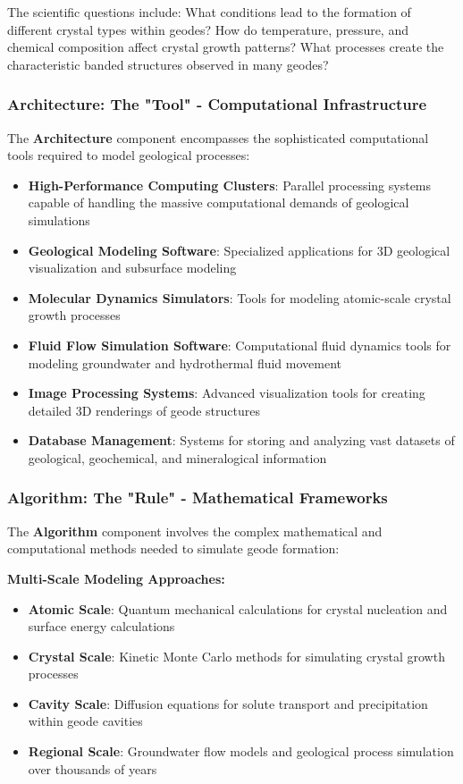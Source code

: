 The scientific questions include: What conditions lead to the formation of different crystal types within geodes? How do temperature, pressure, and chemical composition affect crystal growth patterns? What processes create the characteristic banded structures observed in many geodes?

\subsubsection{Architecture: The "Tool" - Computational Infrastructure}

The \textbf{Architecture} component encompasses the sophisticated computational tools required to model geological processes:

\begin{itemize}
    \item \textbf{High-Performance Computing Clusters}: Parallel processing systems capable of handling the massive computational demands of geological simulations
    \item \textbf{Geological Modeling Software}: Specialized applications for 3D geological visualization and subsurface modeling
    \item \textbf{Molecular Dynamics Simulators}: Tools for modeling atomic-scale crystal growth processes
    \item \textbf{Fluid Flow Simulation Software}: Computational fluid dynamics tools for modeling groundwater and hydrothermal fluid movement
    \item \textbf{Image Processing Systems}: Advanced visualization tools for creating detailed 3D renderings of geode structures
    \item \textbf{Database Management}: Systems for storing and analyzing vast datasets of geological, geochemical, and mineralogical information
\end{itemize}

\subsubsection{Algorithm: The "Rule" - Mathematical Frameworks}

The \textbf{Algorithm} component involves the complex mathematical and computational methods needed to simulate geode formation:

\textbf{Multi-Scale Modeling Approaches:}
\begin{itemize}
    \item \textbf{Atomic Scale}: Quantum mechanical calculations for crystal nucleation and surface energy calculations
    \item \textbf{Crystal Scale}: Kinetic Monte Carlo methods for simulating crystal growth processes
    \item \textbf{Cavity Scale}: Diffusion equations for solute transport and precipitation within geode cavities
    \item \textbf{Regional Scale}: Groundwater flow models and geological process simulation over thousands of years
\end{itemize}

